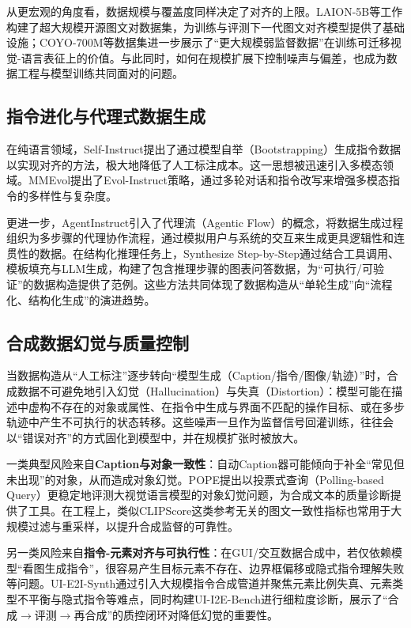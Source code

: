 从更宏观的角度看，数据规模与覆盖度同样决定了对齐的上限。LAION-5B等工作构建了超大规模开源图文对数据集，为训练与评测下一代图文对齐模型提供了基础设施\citep{schuhmann2022laion5b}；COYO-700M等数据集进一步展示了“更大规模弱监督数据”在训练可迁移视觉-语言表征上的价值\citep{byeon2022coyo}。与此同时，如何在规模扩展下控制噪声与偏差，也成为数据工程与模型训练共同面对的问题。

\subsection{指令进化与代理式数据生成}
在纯语言领域，Self-Instruct提出了通过模型自举（Bootstrapping）生成指令数据以实现对齐的方法，极大地降低了人工标注成本\citep{wang2023selfinstruct}。这一思想被迅速引入多模态领域。MMEvol提出了Evol-Instruct策略，通过多轮对话和指令改写来增强多模态指令的多样性与复杂度\citep{xu2024mmevol}。

更进一步，AgentInstruct引入了代理流（Agentic Flow）的概念，将数据生成过程组织为多步骤的代理协作流程，通过模拟用户与系统的交互来生成更具逻辑性和连贯性的数据\citep{mitra2024agentinstruct}。在结构化推理任务上，Synthesize Step-by-Step通过结合工具调用、模板填充与LLM生成，构建了包含推理步骤的图表问答数据，为“可执行/可验证”的数据构造提供了范例\citep{li2024synthesize}。这些方法共同体现了数据构造从“单轮生成”向“流程化、结构化生成”的演进趋势。

\subsection{合成数据幻觉与质量控制}
当数据构造从“人工标注”逐步转向“模型生成（Caption/指令/图像/轨迹）”时，合成数据不可避免地引入幻觉（Hallucination）与失真（Distortion）：模型可能在描述中虚构不存在的对象或属性、在指令中生成与界面不匹配的操作目标、或在多步轨迹中产生不可执行的状态转移。这些噪声一旦作为监督信号回灌训练，往往会以“错误对齐”的方式固化到模型中，并在规模扩张时被放大。

一类典型风险来自\textbf{Caption与对象一致性}：自动Caption器可能倾向于补全“常见但未出现”的对象，从而造成对象幻觉。POPE提出以投票式查询（Polling-based Query）更稳定地评测大视觉语言模型的对象幻觉问题，为合成文本的质量诊断提供了工具\citep{li2023pope}。在工程上，类似CLIPScore这类参考无关的图文一致性指标也常用于大规模过滤与重采样，以提升合成监督的可靠性\citep{hessel2021clipscore}。

另一类风险来自\textbf{指令-元素对齐与可执行性}：在GUI/交互数据合成中，若仅依赖模型“看图生成指令”，很容易产生目标元素不存在、边界框偏移或隐式指令理解失败等问题。UI-E2I-Synth通过引入大规模指令合成管道并聚焦元素比例失真、元素类型不平衡与隐式指令等难点，同时构建UI-I2E-Bench进行细粒度诊断，展示了“合成$\rightarrow$评测$\rightarrow$再合成”的质控闭环对降低幻觉的重要性\citep{liu2025uie2isynth}。


